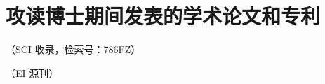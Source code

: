 

\chapter{攻读博士期间发表的学术论文和专利}

{}
{}

\begin{enumerate}[label={[\arabic*]}]
    \item {}（SCI 收录，检索号：786FZ）
    \item {}（EI 源刊）
    \item {}
\end{enumerate}
\endrefsection